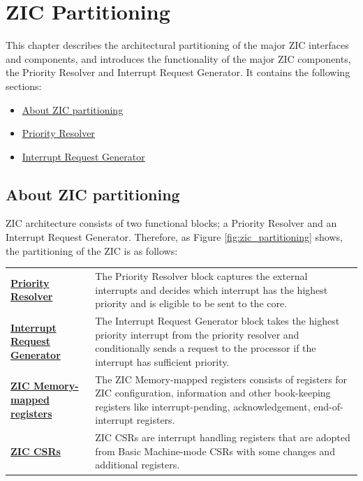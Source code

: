 \chapter{ZIC Partitioning}
This chapter describes the architectural partitioning of the major ZIC interfaces and components, and introduces the functionality of the major ZIC components, the Priority Resolver and Interrupt Request Generator. It contains the following sections:

\begin{itemize}
    \item \hyperref[sec:about-zix-partition]{About ZIC partitioning}
    \item \hyperref[sec:priority-resolve]{Priority Resolver}
    \item \hyperref[sec:interrupt-request-generate]{Interrupt Request Generator}
\end{itemize}
\newpage

\section{About ZIC partitioning}
\label{sec:about-zix-partition}
ZIC architecture consists of two functional blocks; a Priority Resolver and an Interrupt Request Generator. Therefore, as Figure \ref{fig:zic_partitioning} shows, the partitioning of the ZIC is as follows:

\vspace{1cm}
\begin{tabular}{p{6cm} p{8.25cm}}
    \textbf{\hyperref[sec:priority-resolve]{Priority Resolver}} &  The Priority Resolver block captures the external interrupts and decides which interrupt has the highest priority and is eligible to be sent to the core.\\
    \textbf{\hyperref[sec:interrupt-request-generate]{Interrupt Request Generator}} & The Interrupt Request Generator block takes the highest priority interrupt from the priority resolver and conditionally sends a request to the processor if the interrupt has sufficient priority.\\
    \textbf{\hyperref[subsec:zic-register-mem-map]{ZIC Memory-mapped registers}} & The ZIC Memory-mapped registers consists of registers for ZIC configuration, information and other book-keeping registers like interrupt-pending, acknowledgement, end-of-interrupt registers.   \\
    \textbf{\hyperref[subsec:zic-csrs-mem-map]{ZIC CSRs}} & ZIC CSRs are interrupt handling registers that are adopted from Basic Machine-mode CSRs with some changes and additional registers. \\
\end{tabular}
\vspace{0.5cm}


